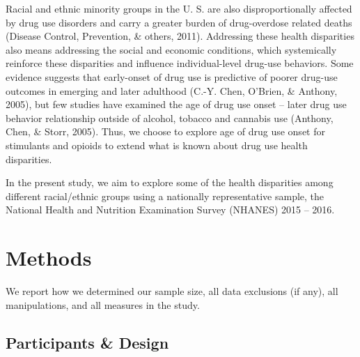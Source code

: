 \documentclass[man]{apa6}
\begin{document}
Racial and ethnic minority groups in the U. S. are also
disproportionally affected by drug use disorders and carry a greater
burden of drug-overdose related deaths (Disease Control, Prevention, \&
others, 2011). Addressing these health disparities also means addressing
the social and economic conditions, which systemically reinforce these
disparities and influence individual-level drug-use behaviors. Some
evidence suggests that early-onset of drug use is predictive of poorer
drug-use outcomes in emerging and later adulthood (C.-Y. Chen, O'Brien,
\& Anthony, 2005), but few studies have examined the age of drug use
onset -- later drug use behavior relationship outside of alcohol,
tobacco and cannabis use (Anthony, Chen, \& Storr, 2005). Thus, we
choose to explore age of drug use onset for stimulants and opioids to
extend what is known about drug use health disparities.

In the present study, we aim to explore some of the health disparities
among different racial/ethnic groups using a nationally representative
sample, the National Health and Nutrition Examination Survey (NHANES)
2015 -- 2016.

\section{Methods}\label{methods}

We report how we determined our sample size, all data exclusions (if
any), all manipulations, and all measures in the study.

\subsection{Participants \& Design}\label{participants-design}
\end{document}
